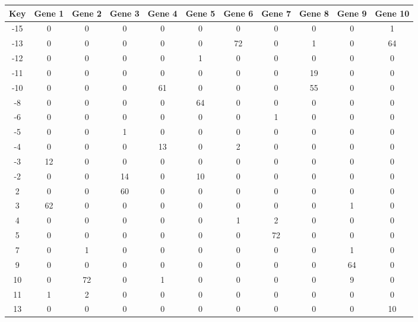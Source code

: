 \begin{tabular}{|c|c|c|c|c|c|c|c|c|c|c|}
\hline
Key & Gene 1 & Gene 2 & Gene 3 & Gene 4 & Gene 5 & Gene 6 & Gene 7 & Gene 8 & Gene 9 & Gene 10 \\
\hline
-15 & 0 & 0 & 0 & 0 & 0 & 0 & 0 & 0 & 0 & 1 \\
-13 & 0 & 0 & 0 & 0 & 0 & 72 & 0 & 1 & 0 & 64 \\
-12 & 0 & 0 & 0 & 0 & 1 & 0 & 0 & 0 & 0 & 0 \\
-11 & 0 & 0 & 0 & 0 & 0 & 0 & 0 & 19 & 0 & 0 \\
-10 & 0 & 0 & 0 & 61 & 0 & 0 & 0 & 55 & 0 & 0 \\
-8 & 0 & 0 & 0 & 0 & 64 & 0 & 0 & 0 & 0 & 0 \\
-6 & 0 & 0 & 0 & 0 & 0 & 0 & 1 & 0 & 0 & 0 \\
-5 & 0 & 0 & 1 & 0 & 0 & 0 & 0 & 0 & 0 & 0 \\
-4 & 0 & 0 & 0 & 13 & 0 & 2 & 0 & 0 & 0 & 0 \\
-3 & 12 & 0 & 0 & 0 & 0 & 0 & 0 & 0 & 0 & 0 \\
-2 & 0 & 0 & 14 & 0 & 10 & 0 & 0 & 0 & 0 & 0 \\
2 & 0 & 0 & 60 & 0 & 0 & 0 & 0 & 0 & 0 & 0 \\
3 & 62 & 0 & 0 & 0 & 0 & 0 & 0 & 0 & 1 & 0 \\
4 & 0 & 0 & 0 & 0 & 0 & 1 & 2 & 0 & 0 & 0 \\
5 & 0 & 0 & 0 & 0 & 0 & 0 & 72 & 0 & 0 & 0 \\
7 & 0 & 1 & 0 & 0 & 0 & 0 & 0 & 0 & 1 & 0 \\
9 & 0 & 0 & 0 & 0 & 0 & 0 & 0 & 0 & 64 & 0 \\
10 & 0 & 72 & 0 & 1 & 0 & 0 & 0 & 0 & 9 & 0 \\
11 & 1 & 2 & 0 & 0 & 0 & 0 & 0 & 0 & 0 & 0 \\
13 & 0 & 0 & 0 & 0 & 0 & 0 & 0 & 0 & 0 & 10 \\
\hline
\end{tabular}
